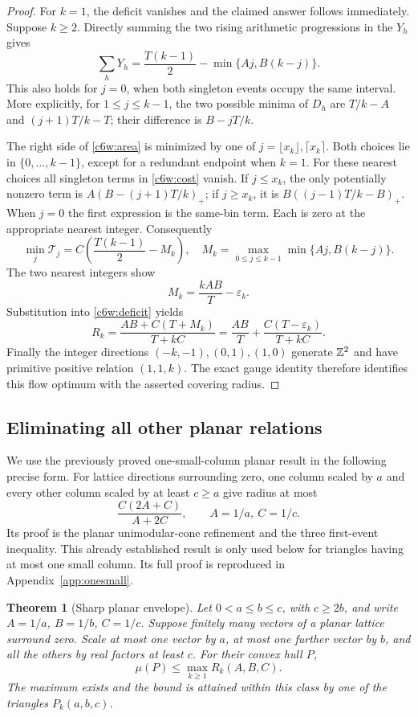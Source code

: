 \documentclass[11pt,a4paper]{article}
\newtheorem{theorem}{Theorem}[section]
\theoremstyle{remark}\newtheorem{remark}[theorem]{Remark}
\begin{document}
\begin{proof}
For $k=1$, the deficit vanishes and the claimed answer follows
immediately.  Suppose $k\ge2$.  Directly summing the two rising
arithmetic progressions in the $Y_h$ gives
\begin{equation}\label{c6w:area}
 \sum_hY_h=\frac{T(k-1)}2-\min\{Aj,B(k-j)\}.
\end{equation}
This also holds for $j=0$, when both singleton events occupy the
same interval.  More explicitly, for $1\le j\le k-1$, the two
possible minima of $D_h$ are $T/k-A$ and $(j+1)T/k-T$;
their difference is $B-jT/k$.

The right side of \eqref{c6w:area} is minimized by one of
$j=\lfloor x_k\rfloor,\lceil x_k\rceil$.  Both choices lie in
$\{0,\ldots,k-1\}$, except for a redundant endpoint when $k=1$.
For these nearest choices all singleton terms in
\eqref{c6w:cost} vanish.  If $j\le x_k$, the only potentially
nonzero term is $A(B-(j+1)T/k)_+$; if $j\ge x_k$, it is
$B((j-1)T/k-B)_+$.  When $j=0$ the first expression is the
same-bin term.  Each is zero at the appropriate nearest integer.
Consequently
\[
 \min_j\mathcal T_j
 =C\left(\frac{T(k-1)}2-M_k\right),
 \quad
 M_k=\max_{0\le j\le k-1}\min\{Aj,B(k-j)\}.
\]
The two nearest integers show
\[
 M_k=\frac{kAB}{T}-\varepsilon_k.
\]
Substitution into \eqref{c6w:deficit} yields
\[
 R_k=\frac{AB+C(T+M_k)}{T+kC}
 =\frac{AB}{T}+\frac{C(T-\varepsilon_k)}{T+kC}.
\]
Finally the integer directions $(-k,-1),(0,1),(1,0)$ generate
$\mathbb Z^2$ and have primitive positive relation $(1,1,k)$.
The exact gauge identity therefore identifies this flow optimum
with the asserted covering radius.
\end{proof}

\subsection{Eliminating all other planar relations}

We use the previously proved one-small-column planar result in
the following precise form.  For lattice directions surrounding
zero, one column scaled by $a$ and every other column scaled by
at least $c\ge a$ give radius at most
\[
 \frac{C(2A+C)}{A+2C},\qquad A=1/a,\ C=1/c.
\]
Its proof is the planar unimodular-cone refinement and the
three first-event inequality.  This already established result is
only used below for triangles having at most one small column.
Its full proof is reproduced in Appendix~\ref{app:onesmall}.

\begin{theorem}[Sharp planar envelope]\label{c6w:envelope}
Let $0<a\le b\le c$, with $c\ge2b$, and write
$A=1/a$, $B=1/b$, $C=1/c$.  Suppose finitely many vectors of a
planar lattice surround zero.  Scale at most one vector by $a$,
at most one further vector by $b$, and all the others by real
factors at least $c$.  For their convex hull $P$,
\begin{equation}\label{c6w:envelopeeq}
 \mu(P)\le \max_{k\ge1}R_k(A,B,C).
\end{equation}
The maximum exists and the bound is attained within this class
by one of the triangles $P_k(a,b,c)$.
\end{theorem}
\end{document}
